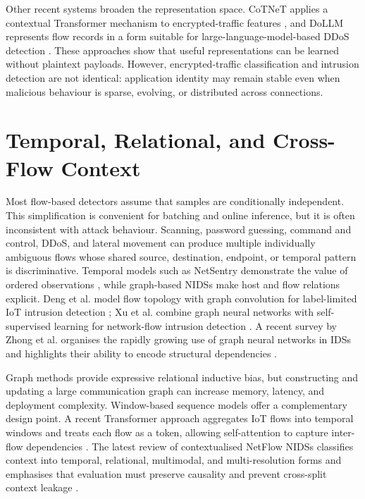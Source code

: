\documentclass[11pt,fleqn]{report}
\begin{document}
Other recent systems broaden the representation space. CoTNeT applies a contextual Transformer mechanism to encrypted-traffic features \cite{Huang2024CoTNet}, and DoLLM represents flow records in a form suitable for large-language-model-based DDoS detection \cite{Li2024DoLLM}. These approaches show that useful representations can be learned without plaintext payloads. However, encrypted-traffic classification and intrusion detection are not identical: application identity may remain stable even when malicious behaviour is sparse, evolving, or distributed across connections.

\section{Temporal, Relational, and Cross-Flow Context}
\label{subsec:rw_cross_flow}

Most flow-based detectors assume that samples are conditionally independent. This simplification is convenient for batching and online inference, but it is often inconsistent with attack behaviour. Scanning, password guessing, command and control, DDoS, and lateral movement can produce multiple individually ambiguous flows whose shared source, destination, endpoint, or temporal pattern is discriminative. Temporal models such as NetSentry demonstrate the value of ordered observations \cite{LiuPatras2022NetSentry}, while graph-based NIDSs make host and flow relations explicit. Deng et al. model flow topology with graph convolution for label-limited IoT intrusion detection \cite{Deng2023FlowTopology}; Xu et al. combine graph neural networks with self-supervised learning for network-flow intrusion detection \cite{Xu2024SSLGNN}. A recent survey by Zhong et al. organises the rapidly growing use of graph neural networks in IDSs and highlights their ability to encode structural dependencies \cite{Zhong2024GNNSurvey}.

Graph methods provide expressive relational inductive bias, but constructing and updating a large communication graph can increase memory, latency, and deployment complexity. Window-based sequence models offer a complementary design point. A recent Transformer approach aggregates IoT flows into temporal windows and treats each flow as a token, allowing self-attention to capture inter-flow dependencies \cite{MartinReizabal2026FlowWindow}. The latest review of contextualised NetFlow NIDSs classifies context into temporal, relational, multimodal, and multi-resolution forms and emphasises that evaluation must preserve causality and prevent cross-split context leakage \cite{ElMahdaouy2026ContextNetFlow}.
\end{document}
